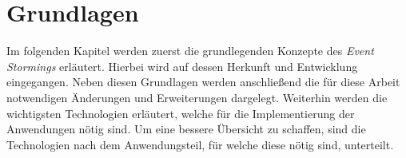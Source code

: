 \chapter{Grundlagen}\label{ch:grundlagen}
Im folgenden Kapitel werden zuerst die grundlegenden Konzepte des \textit{Event Stormings} erläutert.
Hierbei wird auf dessen Herkunft und Entwicklung eingegangen.
Neben diesen Grundlagen werden anschließend die für diese Arbeit notwendigen Änderungen und Erweiterungen dargelegt.
Weiterhin werden die wichtigsten Technologien erläutert, welche für die Implementierung der Anwendungen nötig sind.
Um eine bessere Übersicht zu schaffen, sind die Technologien nach dem Anwendungsteil, für welche diese nötig sind, unterteilt.




